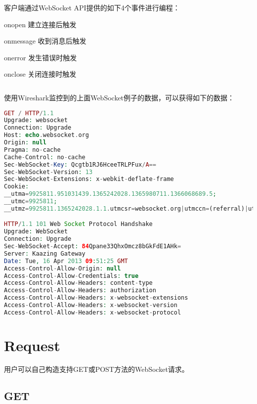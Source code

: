 客户端通过WebSocket API提供的如下4个事件进行编程：

\begin{compactitem}
\item onopen 建立连接后触发
\item onmessage 收到消息后触发
\item onerror 发生错误时触发
\item onclose 关闭连接时触发
\end{compactitem}




\begin{lstlisting}[language=PHP]

\end{lstlisting}


使用Wireshark监控到的上面WebSocket例子的数据，可以获得如下的数据：

\begin{lstlisting}[language=PHP]
GET / HTTP/1.1
Upgrade: websocket
Connection: Upgrade
Host: echo.websocket.org
Origin: null
Pragma: no-cache
Cache-Control: no-cache
Sec-WebSocket-Key: Qcgtb1RJ6HceeTRLPFux/A==
Sec-WebSocket-Version: 13
Sec-WebSocket-Extensions: x-webkit-deflate-frame
Cookie: 
__utma=9925811.951031439.1365242028.1365980711.1366068689.5; 
__utmc=9925811; 
__utmz=9925811.1365242028.1.1.utmcsr=websocket.org|utmccn=(referral)|utmcmd=referral|utmcct=/

HTTP/1.1 101 Web Socket Protocol Handshake
Upgrade: WebSocket
Connection: Upgrade
Sec-WebSocket-Accept: 84Qpane33QhxOmcz8bGkFdE1AHk=
Server: Kaazing Gateway
Date: Tue, 16 Apr 2013 09:51:25 GMT
Access-Control-Allow-Origin: null
Access-Control-Allow-Credentials: true
Access-Control-Allow-Headers: content-type
Access-Control-Allow-Headers: authorization
Access-Control-Allow-Headers: x-websocket-extensions
Access-Control-Allow-Headers: x-websocket-version
Access-Control-Allow-Headers: x-websocket-protocol
\end{lstlisting}



\section{Request}

用户可以自己构造支持GET或POST方法的WebSocket请求。

\subsection{GET}


